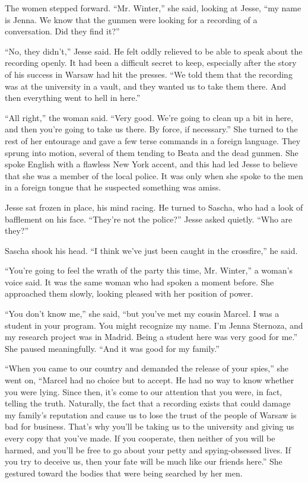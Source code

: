 \documentclass[12pt]{book}
\begin{document}
The women stepped forward.  ``Mr. Winter,'' she said, looking at Jesse, ``my name is Jenna.  We know that the gunmen were looking for a recording of a conversation.  Did they find it?''

``No, they didn't,'' Jesse said.  He felt oddly relieved to be able to speak about the recording openly.  It had been a difficult secret to keep, especially after the story of his success in Warsaw had hit the presses.  ``We told them that the recording was at the university in a vault, and they wanted us to take them there.  And then everything went to hell in here.''

``All right,'' the woman said.  ``Very good.  We're going to clean up a bit in here, and then you're going to take us there.  By force, if necessary.''  She turned to the rest of her entourage and gave a few terse commands in a foreign language.  They sprung into motion, several of them tending to Beata and the dead gunmen.  She spoke English with a flawless New York accent, and this had led Jesse to believe that she was a member of the local police.  It was only when she spoke to the men in a foreign tongue that he suspected something was amiss.

Jesse sat frozen in place, his mind racing.  He turned to Sascha, who had a look of bafflement on his face.  ``They're not the police?'' Jesse asked quietly.  ``Who are they?''

Sascha shook his head.  ``I think we've just been caught in the crossfire,'' he said.

``You're going to feel the wrath of the party this time, Mr. Winter,'' a woman's voice said.  It was the same woman who had spoken a moment before.  She approached them slowly, looking pleased with her position of power.

``You don't know me,'' she said, ``but you've met my cousin Marcel.  I was a student in your program.  You might recognize my name.  I'm Jenna Sternoza, and my research project was in Madrid.  Being a student here was very good for me.''  She paused meaningfully.  ``And it was good for my family.''

``When you came to our country and demanded the release of your spies,'' she went on, ``Marcel had no choice but to accept.  He had no way to know whether you were lying.  Since then, it's come to our attention that you were, in fact, telling the truth.  Naturally, the fact that a recording exists that could damage my family's reputation and cause us to lose the trust of the people of Warsaw is bad for business.  That's why you'll be taking us to the university and giving us every copy that you've made.  If you cooperate, then neither of you will be harmed, and you'll be free to go about your petty and spying-obsessed lives.  If you try to deceive us, then your fate will be much like our friends here.''  She gestured toward the bodies that were being searched by her men.
\end{document}
